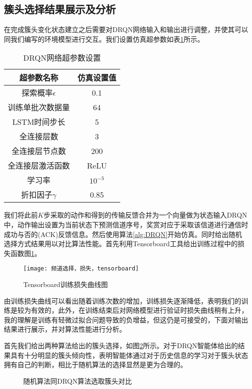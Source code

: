 \subsection{簇头选择结果展示及分析}
在完成簇头变化状态建立之后需要对DRQN网络输入和输出进行调整，并使其可以同我们编写的环境模型进行交互。我们设置仿真超参数如表\ref{tab:超参数}所示。
\begin{table}[htbp]
	\caption{DRQN网络超参数设置}\label{tab:超参数}
	\vspace{0.5em}\centering\wuhao
	\begin{tabular}{cc}
		\toprule[1.5pt]
		超参数名称 & 仿真设置值 \\
		\midrule[1pt]
		探索概率$\epsilon$ & 0.1 \\
		训练单批次数据量 & 64\\
		LSTM时间步长 & 5 \\
		全连接层数 & 3 \\
		全连接层节点数 & 200 \\
		全连接层激活函数 & ReLU \\
		学习率 & $10^{-5}$ \\
		折扣因子$\gamma$ & 0.85 \\
		\bottomrule[1.5pt]
	\end{tabular}
\end{table}
我们将此前$K$步采取的动作和得到的传输反馈合并为一个向量做为状态输入DRQN中，动作输出设置为当前状态下预测信道序号，奖赏对应于采取该信道进行通信时成功与否的(ACK)反馈信息。然后使用算法\ref{alg:DRQN}开始仿真。同时给出随机选择方式结果用以对比算法性能。首先利用Tensorboard工具给出训练过程中的损失函数图\ref{fig：簇头训练loss}。 
\begin{figure}[htbp]
	\centering
	\texttt{[image: 频道选择，损失，tensorboard]}
	\caption{Tensorboard训练损失曲线图}
	\label{fig：簇头训练loss}
\end{figure}
由训练损失曲线可以看出随着训练次数的增加，训练损失逐渐降低，表明我们的训练是较为有效的，此外，在训练结束后对网络模型进行验证时损失曲线稍有上升，我的理解是训练有轻微过拟合问题导致的负增益，但这仍是可接受的，下面对输出结果进行展示，并对算法性能进行分析。

首先我们给出两种算法给出的簇头选择，如图\ref{fig:簇头动作对比}所示。对于DRQN智能体给出的结果具有十分明显的簇头倾向性，表明智能体通过对于历史信息的学习对于簇头状态拥有自己的判断，相比于随机算法的选择显然是更为合理的。

\begin{figure}[htbp]
	\begin{minipage}{\textwidth}
		\centering
		\subfigure{\label{fig:簇头动作DRQN}}\addtocounter{subfigure}{-2}
		\hspace{1em}
		\subfigure{\label{fig:簇头动作random}}\addtocounter{subfigure}{-2}
		\hspace{1em}	
	\end{minipage}
	\vspace{0.2em}
	\caption{随机算法同DRQN算法选取簇头对比}\label{fig:簇头动作对比}
\end{figure}

